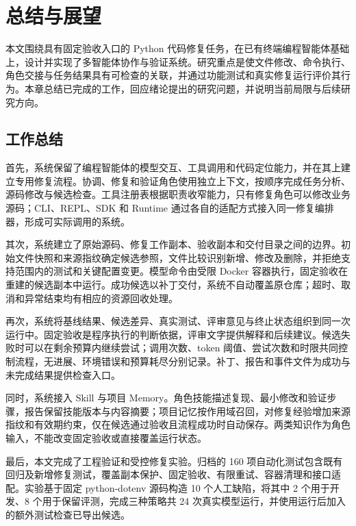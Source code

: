 \chapter{总结与展望}\label{chap:7}

本文围绕具有固定验收入口的 Python 代码修复任务，在已有终端编程智能体基础上，设计并实现了多智能体协作与验证系统。研究重点是使文件修改、命令执行、角色交接与任务结果具有可检查的关联，并通过功能测试和真实修复运行评价其行为。本章总结已完成的工作，回应绪论提出的研究问题，并说明当前局限与后续研究方向。

\section{工作总结}\label{sec:7.1}

首先，系统保留了编程智能体的模型交互、工具调用和代码定位能力，并在其上建立专用修复流程。协调、修复和验证角色使用独立上下文，按顺序完成任务分析、源码修改与候选检查。工具注册表根据职责收窄能力，只有修复角色可以修改业务源码；CLI、REPL、SDK 和 Runtime 通过各自的适配方式接入同一修复编排器，形成可实际调用的系统。

其次，系统建立了原始源码、修复工作副本、验收副本和交付目录之间的边界。初始文件快照和来源指纹确定候选参照，文件比较识别新增、修改及删除，并拒绝支持范围内的测试和关键配置变更。模型命令由受限 Docker 容器执行，固定验收在重建的候选副本中运行。成功候选以补丁交付，系统不自动覆盖原仓库；超时、取消和异常结束均有相应的资源回收处理。

再次，系统将基线结果、候选差异、真实测试、评审意见与终止状态组织到同一次运行中。固定验收是程序执行的判断依据，评审文字提供解释和后续建议。候选失败时可以在剩余预算内继续尝试；调用次数、token 阈值、尝试次数和时限共同控制流程，无进展、环境错误和预算耗尽分别记录。补丁、报告和事件文件为成功与未完成结果提供检查入口。

同时，系统接入 Skill 与项目 Memory。角色技能描述复现、最小修改和验证步骤，报告保留技能版本与内容摘要；项目记忆按作用域召回，对修复经验增加来源指纹和有效期约束，仅在候选通过验收且流程成功时自动保存。两类知识作为角色输入，不能改变固定验收或直接覆盖运行状态。

最后，本文完成了工程验证和受控修复实验。归档的 160 项自动化测试包含既有回归及新增修复测试，覆盖副本保护、固定验收、有限重试、容器清理和接口适配。实验基于固定 python-dotenv 源码构造 10 个人工缺陷，将其中 2 个用于开发、8 个用于保留评测，完成三种策略共 24 次真实模型运行，并使用运行后加入的额外测试检查已导出候选。

